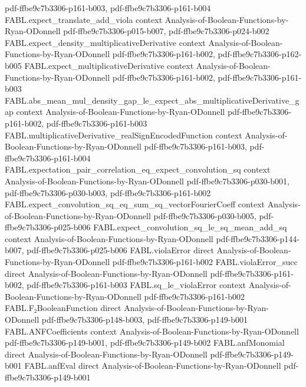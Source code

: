 \begin{theorem}
  {pdf-ffbe9c7b3306-p161-b003,
    pdf-ffbe9c7b3306-p161-b004}
\proofstep
  {FABL.expect_translate_add_viola}
  {context}
  {Analysis-of-Boolean-Functions-by-Ryan-ODonnell}
  {pdf-ffbe9c7b3306-p015-b007,
    pdf-ffbe9c7b3306-p024-b002}
\proofstep
  {FABL.expect_density_multiplicativeDerivative}
  {context}
  {Analysis-of-Boolean-Functions-by-Ryan-ODonnell}
  {pdf-ffbe9c7b3306-p161-b002,
    pdf-ffbe9c7b3306-p162-b005}
\proofstep
  {FABL.expect_multiplicativeDerivative}
  {context}
  {Analysis-of-Boolean-Functions-by-Ryan-ODonnell}
  {pdf-ffbe9c7b3306-p161-b002,
    pdf-ffbe9c7b3306-p161-b003}
\proofstep
  {FABL.abs_mean_mul_density_gap_le_expect_abs_multiplicativeDerivative_gap}
  {context}
  {Analysis-of-Boolean-Functions-by-Ryan-ODonnell}
  {pdf-ffbe9c7b3306-p161-b002,
    pdf-ffbe9c7b3306-p161-b003}
\proofstep
  {FABL.multiplicativeDerivative_realSignEncodedFunction}
  {context}
  {Analysis-of-Boolean-Functions-by-Ryan-ODonnell}
  {pdf-ffbe9c7b3306-p161-b003,
    pdf-ffbe9c7b3306-p161-b004}
\proofstep
  {FABL.expectation_pair_correlation_eq_expect_convolution_sq}
  {context}
  {Analysis-of-Boolean-Functions-by-Ryan-ODonnell}
  {pdf-ffbe9c7b3306-p030-b001,
    pdf-ffbe9c7b3306-p030-b003,
    pdf-ffbe9c7b3306-p161-b002}
\proofstep
  {FABL.expect_convolution_sq_eq_sum_sq_vectorFourierCoeff}
  {context}
  {Analysis-of-Boolean-Functions-by-Ryan-ODonnell}
  {pdf-ffbe9c7b3306-p030-b005,
    pdf-ffbe9c7b3306-p025-b006}
\proofstep
  {FABL.expect_convolution_sq_le_sq_mean_add_sq}
  {context}
  {Analysis-of-Boolean-Functions-by-Ryan-ODonnell}
  {pdf-ffbe9c7b3306-p144-b007,
    pdf-ffbe9c7b3306-p025-b006}
\proofstep
  {FABL.violaError}
  {direct}
  {Analysis-of-Boolean-Functions-by-Ryan-ODonnell}
  {pdf-ffbe9c7b3306-p161-b002}
\proofstep
  {FABL.violaError_succ}
  {direct}
  {Analysis-of-Boolean-Functions-by-Ryan-ODonnell}
  {pdf-ffbe9c7b3306-p161-b002,
    pdf-ffbe9c7b3306-p161-b003}
\proofstep
  {FABL.sq_le_violaError}
  {context}
  {Analysis-of-Boolean-Functions-by-Ryan-ODonnell}
  {pdf-ffbe9c7b3306-p161-b002}
\proofstep
  {FABL.F₂BooleanFunction}
  {direct}
  {Analysis-of-Boolean-Functions-by-Ryan-ODonnell}
  {pdf-ffbe9c7b3306-p148-b003,
    pdf-ffbe9c7b3306-p149-b001}
\proofstep
  {FABL.ANFCoefficients}
  {context}
  {Analysis-of-Boolean-Functions-by-Ryan-ODonnell}
  {pdf-ffbe9c7b3306-p149-b001,
    pdf-ffbe9c7b3306-p149-b002}
\proofstep
  {FABL.anfMonomial}
  {direct}
  {Analysis-of-Boolean-Functions-by-Ryan-ODonnell}
  {pdf-ffbe9c7b3306-p149-b001}
\proofstep
  {FABL.anfEval}
  {direct}
  {Analysis-of-Boolean-Functions-by-Ryan-ODonnell}
  {pdf-ffbe9c7b3306-p149-b001}

\end{theorem}
